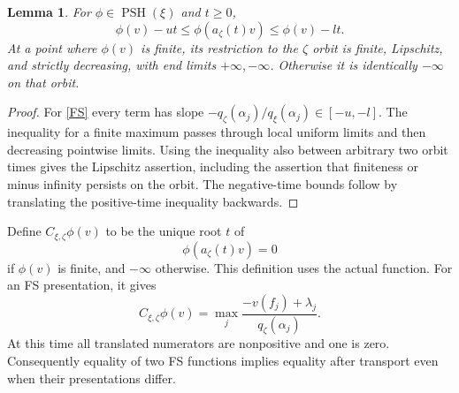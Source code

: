 \documentclass[11pt]{article}
\newtheorem{lemma}[theorem]{Lemma}
\newcommand{\PSH}{\operatorname{PSH}}
\begin{document}
\begin{lemma}\label{slopes}
For $\phi\in\PSH(\xi)$ and $t\geq0$,
\begin{equation}\label{slopes-eq}
 \phi(v)-ut\leq\phi(a_\zeta(t)v)\leq\phi(v)-lt.
\end{equation}
At a point where $\phi(v)$ is finite, its restriction to the $\zeta$ orbit is finite, Lipschitz, and strictly decreasing, with end limits $+\infty,-\infty$.
Otherwise it is identically $-\infty$ on that orbit.
\end{lemma}
\begin{proof}
For \eqref{FS} every term has slope $-q_\zeta(\alpha_j)/q_\xi(\alpha_j)\in[-u,-l]$.
The inequality for a finite maximum passes through local uniform limits and then decreasing pointwise limits.
Using the inequality also between arbitrary two orbit times gives the Lipschitz assertion, including the assertion that finiteness or minus infinity persists on the orbit.
The negative-time bounds follow by translating the positive-time inequality backwards.
\end{proof}

Define $C_{\xi,\zeta}\phi(v)$ to be the unique root $t$ of
\begin{equation}\label{root}
 \phi(a_\zeta(t)v)=0
\end{equation}
if $\phi(v)$ is finite, and $-\infty$ otherwise.
This definition uses the actual function.
For an FS presentation, it gives
\begin{equation}\label{transport}
 C_{\xi,\zeta}\phi(v)=
 \max_j\frac{-v(f_j)+\lambda_j}{q_\zeta(\alpha_j)}.
\end{equation}
At this time all translated numerators are nonpositive and one is zero.
Consequently equality of two FS functions implies equality after transport even when their presentations differ.
\end{document}
